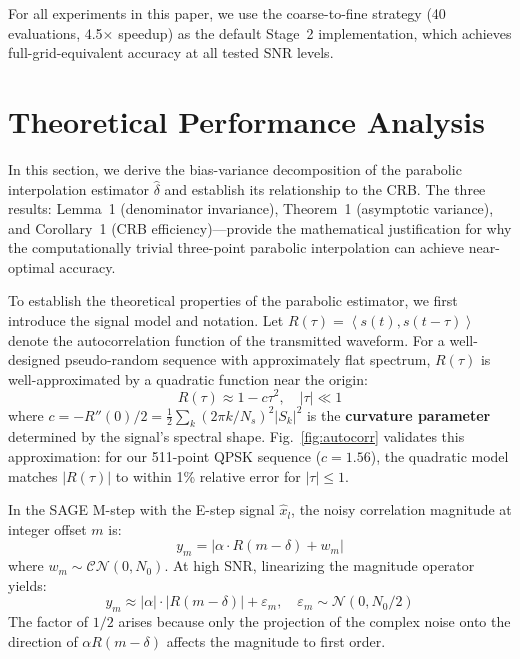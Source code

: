 \documentclass[a4paper,fleqn]{cas-dc}
\newcommand{\Nc}{\mathcal{N}}
\newcommand{\cN}{\mathcal{CN}}
\newcommand{\abs}[1]{\left| #1 \right|}
\newcommand{\inner}[2]{\left\langle #1, #2 \right\rangle}
\newcommand{\hb}[1]{\hat{#1}}
\begin{document}
For all experiments in this paper, we use the coarse-to-fine strategy (40 evaluations, 4.5$\times$ speedup) as the default Stage~2 implementation, which achieves full-grid-equivalent accuracy at all tested SNR levels.

\section{Theoretical Performance Analysis}
\label{sec:theory}

In this section, we derive the bias-variance decomposition of the parabolic interpolation estimator $\hat{\delta}$ and establish its relationship to the CRB. The three results: Lemma~1 (denominator invariance), Theorem~1 (asymptotic variance), and Corollary~1 (CRB efficiency)---provide the mathematical justification for why the computationally trivial three-point parabolic interpolation can achieve near-optimal accuracy.

To establish the theoretical properties of the parabolic estimator, we first introduce the signal model and notation. Let $R(\tau) = \inner{s(t)}{s(t-\tau)}$ denote the autocorrelation function of the transmitted waveform. For a well-designed pseudo-random sequence with approximately flat spectrum, $R(\tau)$ is well-approximated by a quadratic function near the origin:
\begin{equation}
R(\tau) \approx 1 - c\tau^2, \quad |\tau| \ll 1
\label{eq:quadratic}
\end{equation}
where $c = -R''(0)/2 = \frac{1}{2}\sum_k (2\pi k/N_s)^2|S_k|^2$ is the \textbf{curvature parameter} determined by the signal's spectral shape. Fig.~\ref{fig:autocorr} validates this approximation: for our 511-point QPSK sequence ($c = 1.56$), the quadratic model matches $|R(\tau)|$ to within 1\% relative error for $|\tau| \leq 1$.

In the SAGE M-step with the E-step signal $\hb{x}_l$, the noisy correlation magnitude at integer offset $m$ is:
\begin{equation}
y_m = \abs{\alpha \cdot R(m - \delta) + w_m}
\label{eq:ym}
\end{equation}
where $w_m \sim \cN(0, N_0)$. At high SNR, linearizing the magnitude operator yields:
\begin{equation}
y_m \approx |\alpha| \cdot |R(m-\delta)| + \varepsilon_m, \quad \varepsilon_m \sim \Nc(0, N_0/2)
\label{eq:ym_lin}
\end{equation}
The factor of $1/2$ arises because only the projection of the complex noise onto the direction of $\alpha R(m-\delta)$ affects the magnitude to first order.
\end{document}
